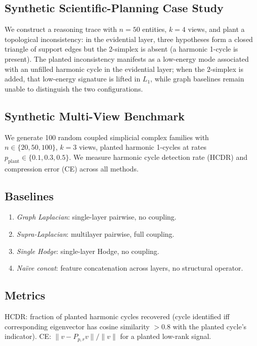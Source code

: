 \documentclass[11pt]{article}
\theoremstyle{definition}
\theoremstyle{remark}
\newcommand{\Pp}{P_{p,r}}
\begin{document}
\subsection{Synthetic Scientific-Planning Case Study}

We construct a reasoning trace with $n=50$ entities, $k=4$ views, and plant a
topological inconsistency: in the evidential layer, three hypotheses form a
closed triangle of support edges but the 2-simplex is absent (a harmonic 1-cycle
is present). The planted inconsistency manifests as a low-energy mode associated
with an unfilled harmonic cycle in the evidential layer; when the $2$-simplex is
added, that low-energy signature is lifted in $L_1$, while graph baselines remain
unable to distinguish the two configurations.

\subsection{Synthetic Multi-View Benchmark}

We generate 100 random coupled simplicial complex families with
$n\in\{20,50,100\}$, $k=3$ views, planted harmonic 1-cycles at rates
$p_{\mathrm{plant}}\in\{0.1, 0.3, 0.5\}$. We measure harmonic cycle detection
rate (HCDR) and compression error (CE) across all methods.

\subsection{Baselines}

\begin{enumerate}
\item \textit{Graph Laplacian}: single-layer pairwise, no coupling.
\item \textit{Supra-Laplacian}: multilayer pairwise, full coupling.
\item \textit{Single Hodge}: single-layer Hodge, no coupling.
\item \textit{Na\"ive concat}: feature concatenation across layers, no
      structural operator.
\end{enumerate}

\subsection{Metrics}

HCDR: fraction of planted harmonic cycles recovered (cycle identified iff
corresponding eigenvector has cosine similarity $>0.8$ with the planted
cycle's indicator). CE: $\|v-\Pp v\|/\|v\|$ for a planted low-rank signal.
\end{document}
